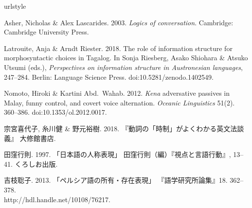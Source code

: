 \documentclass{goken}
\begin{document}
\begin{thebibliography}{6}
\providecommand{\natexlab}[1]{#1}
\providecommand{\url}[1]{#1}
\providecommand{\urlprefix}{}
\expandafter\ifx\csname urlstyle\endcsname\relax
  \providecommand{\doi}[1]{doi:\discretionary{}{}{}#1}\else
  \providecommand{\doi}{doi:\discretionary{}{}{}\begingroup
  \urlstyle{rm}\Url}\fi

Asher, Nicholas \& Alex Lascarides. 2003.
\newblock \emph{Logics of conversation}.
\newblock Cambridge: Cambridge University Press.

Latrouite, Anja \& Arndt Riester. 2018.
\newblock The role of information structure for morphosyntactic choices in
  {Tagalog}.
\newblock In Sonja Riesberg, Asako Shiohara \& Atsuko Utsumi (eds.),
  \emph{Perspectives on information structure in {Austronesian} languages},
  247--284. Berlin: Language Science Press.
\newblock \doi{10.5281/zenodo.1402549}.

Nomoto, Hiroki \& Kartini Abd.~Wahab. 2012.
\newblock \textit{Kena} adversative passives in {M}alay, funny control, and
  covert voice alternation.
\newblock \emph{Oceanic Linguistics} 51(2). 360--386.
\newblock \doi{10.1353/ol.2012.0017}.

宗宮喜代子, 糸川健 \& 野元裕樹. 2018.
\newblock 『動詞の「時制」がよくわかる英文法談義』
\newblock 大修館書店.

田窪行則. 1997.
\newblock 「日本語の人称表現」
\newblock 田窪行則（編）『視点と言語行動』, 13--41. くろしお出版.

吉枝聡子. 2013.
\newblock 「ペルシア語の所有・存在表現」
\newblock 『語学研究所論集』18. 362--378.\\
  \urlprefix\url{http://hdl.handle.net/10108/76217}.

\end{thebibliography}
\metainfo
\end{document}
